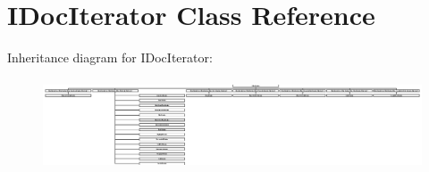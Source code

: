\hypertarget{class_i_doc_iterator}{}\section{I\+Doc\+Iterator Class Reference}
\label{class_i_doc_iterator}
Inheritance diagram for I\+Doc\+Iterator\+:\begin{figure}[H]
\begin{center}
\leavevmode
\includegraphics[height=2.723112cm]{class_i_doc_iterator}
\end{center}
\end{figure}
